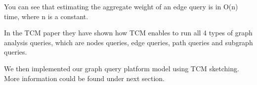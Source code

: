 \documentclass[conference]{IEEEtran}
\begin{document}
You can see that estimating the aggregate weight of an edge query is in O(n) time, where n is a constant.


In the TCM paper they have shown how TCM enables to run all 4 types of graph analysis queries, which are nodes queries, edge queries, path queries and subgraph queries. 

We then implemented our graph query platform model using TCM sketching. More information could be found under next section.

%
%



%
%
\end{document}
